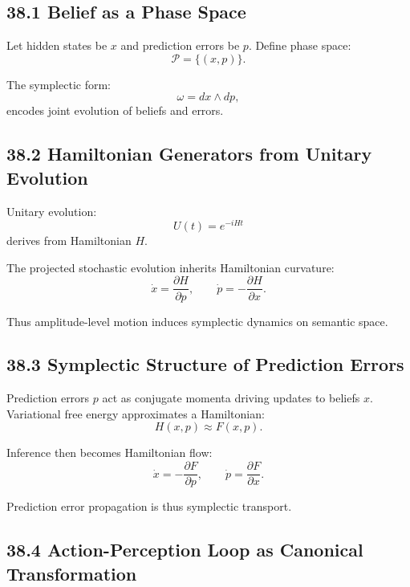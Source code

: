 \documentclass[12pt,letterpaper]{article}
\theoremstyle{remark}
\begin{document}
\subsection{38.1 Belief as a Phase Space}

Let hidden states be $x$ and prediction errors be $p$.  
Define phase space:
\[
\mathcal{P} = \{(x,p)\}.
\]

The symplectic form:
\[
\omega = dx \wedge dp,
\]
encodes joint evolution of beliefs and errors.

\subsection{38.2 Hamiltonian Generators from Unitary Evolution}

Unitary evolution:
\[
U(t) = e^{-iHt}
\]
derives from Hamiltonian $H$.

The projected stochastic evolution inherits Hamiltonian curvature:
\[
\dot{x} = \frac{\partial H}{\partial p}, \qquad
\dot{p} = -\frac{\partial H}{\partial x}.
\]

Thus amplitude-level motion induces symplectic dynamics on semantic space.

\subsection{38.3 Symplectic Structure of Prediction Errors}

Prediction errors $p$ act as conjugate momenta driving updates to beliefs $x$.  
Variational free energy approximates a Hamiltonian:
\[
H(x,p) \approx F(x,p).
\]

Inference then becomes Hamiltonian flow:
\[
\dot{x} = -\frac{\partial F}{\partial p}, \qquad
\dot{p} = \frac{\partial F}{\partial x}.
\]

Prediction error propagation is thus symplectic transport.

\subsection{38.4 Action-Perception Loop as Canonical Transformation}
\end{document}
